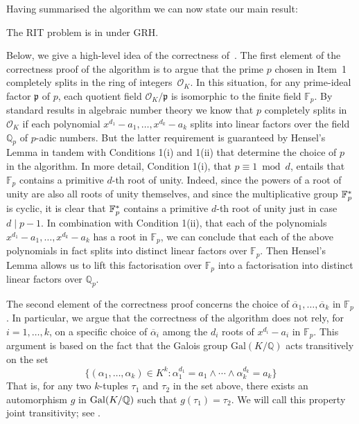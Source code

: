     
    Having summarised the algorithm we can now state our main result: 
 
\begin{theorem}\label{th:rit-conp}
	The RIT problem is in {\coNP} under GRH.
\end{theorem}
    
 Below, we give a high-level idea of the correctness of~.
   The first element of the correctness proof of the {\coNP} algorithm  is to argue that the prime $p$ chosen in Item~1 completely splits
    in the ring of integers~$\mathcal{O}_K$.
    In this situation, for any prime-ideal factor $\mathfrak{p}$ of $p$, each quotient field $\mathcal{O}_K / \mathfrak{p}$
    is isomorphic to the finite field $\mathbb{F}_p$.  
    By standard results in algebraic number theory we know that $p$ completely splits in $\mathcal{O}_K$
    if each polynomial $x^{d_1}-a_1,\ldots,x^{d_k}-a_k$ splits into linear factors over the field $\mathbb{Q}_p$ of $p$-adic numbers.
    But the latter requirement is guaranteed by Hensel's Lemma in tandem with Conditions 1(i) and 1(ii) that determine the choice of $p$ in the algorithm.
    In more detail, 
    Condition 1(i), that $p \equiv 1 \bmod d$, entails that $\mathbb{F}_p$ contains 
    a primitive $d$-th root of unity. 
Indeed, since the powers of a root of unity are also all  roots of unity themselves, and since the multiplicative group $\mathbb{F}_p^{*}$ is cyclic, it is clear that $\mathbb{F}_p^{*}$ contains
a primitive $d$-th root of unity just in case $d \mid p-1$. 
      In combination with Condition 1(ii), that each of the polynomials 
    $x^{d_1}-a_1, \ldots, x^{d_k} - a_k$
    has a root in $\mathbb{F}_p$, we can conclude that
    each of the above polynomials in fact splits into distinct linear factors over $\mathbb{F}_p$.
    Then Hensel's Lemma allows us to lift this factorisation over $\mathbb{F}_p$ into a factorisation 
    into distinct linear factors over $\mathbb{Q}_p$.
    

    
    The second element of the correctness proof concerns the choice of 
    $\overline{\alpha}_1,\ldots,\overline{\alpha}_k$ in $\mathbb{F}_p$.   In particular,
    we argue that the correctness of the algorithm does not rely, for $i=1,\ldots,k$, on a specific choice of $\overline{\alpha}_i$
    among the $d_i$ roots of $x^{d_i} - a_i$ in $\mathbb{F}_p$.  This argument is based on the fact
    that the Galois group
    $\mathrm{Gal}(K / \mathbb{Q})$ acts transitively on the set 
    \[ \{ (\alpha_1,\ldots,\alpha_k) \in K^k : \alpha_1^{d_1}=a_1 \wedge \cdots \wedge \alpha_k^{d_k} = a_k \} \]
   	   	 That is, for any two $k$-tuples $\tau_1$ and $\tau_2$ in the set above, there exists an automorphism $g$ in $\operatorname{Gal}(K/\mathbb{Q})$ such that $g(\tau_1) = \tau_2$.
    We will call this property joint transitivity; see .
 
